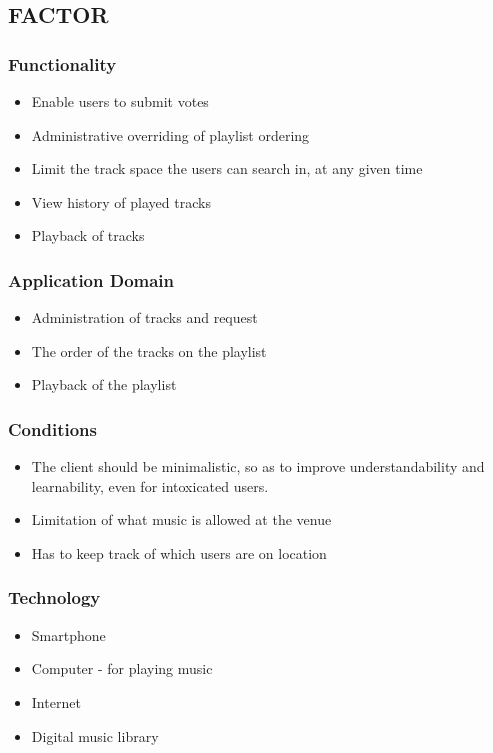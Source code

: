 \subsection{FACTOR}
\subsubsection{Functionality}
\begin{itemize}
    \item Enable users to submit votes
    \item Administrative overriding of playlist ordering
    \item Limit the track space the users can search in, at any given time
    \item View history of played tracks
    \item Playback of tracks
\end{itemize}

\subsubsection{Application Domain}
\begin{itemize}
    \item Administration of tracks and request
    \item The order of the tracks on the playlist
    \item Playback of the playlist
\end{itemize}

\subsubsection{Conditions}
\begin{itemize}
    \item The client should be minimalistic, so as to improve understandability and learnability, even for intoxicated users.
    \item Limitation of what music is allowed at the venue
    \item Has to keep track of which users are on location
\end{itemize}

\subsubsection{Technology}
\begin{itemize}
    \item Smartphone
    \item Computer - for playing music
    \item Internet
    \item Digital music library
\end{itemize}

